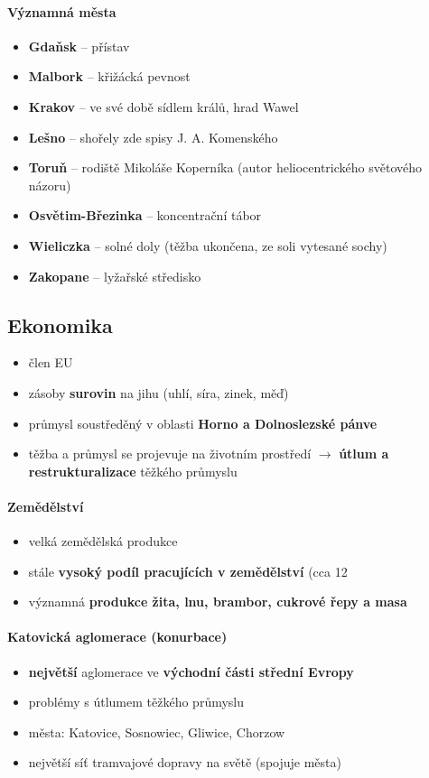 \documentclass[10pt,a4paper]{article}
\begin{document}
\paragraph{Významná města}
\begin{itemize}
\item \textbf{Gdaňsk} -- přístav
\item \textbf{Malbork} -- křižácká pevnost
\item \textbf{Krakov} -- ve své době sídlem králů, hrad Wawel
\item \textbf{Lešno} -- shořely zde spisy J. A. Komenského
\item \textbf{Toruň} -- rodiště Mikoláše Koperníka (autor heliocentrického světového názoru)
\item \textbf{Osvětim-Březinka} -- koncentrační tábor
\item \textbf{Wieliczka} -- solné doly (těžba ukončena, ze soli vytesané sochy)
\item \textbf{Zakopane} -- lyžařské středisko
\end{itemize}


\subsection{Ekonomika}
\begin{itemize}
\item člen EU
\item zásoby \textbf{surovin} na jihu (uhlí, síra, zinek, měď)
\item průmysl soustředěný v oblasti \textbf{Horno a Dolnoslezské pánve}
\item těžba a průmysl se projevuje na životním prostředí $\rightarrow$\textbf{ útlum a restrukturalizace} těžkého průmyslu
\end{itemize}

\paragraph{Zemědělství}
\begin{itemize}
\item velká zemědělská produkce
\item stále \textbf{vysoký podíl pracujících v zemědělství} (cca 12%
\item významná \textbf{produkce žita, lnu, brambor, cukrové řepy a masa}
\end{itemize}

\paragraph{Katovická aglomerace (konurbace)}
\begin{itemize}
\item \textbf{největší} aglomerace ve \textbf{východní části střední Evropy}
\item problémy s útlumem těžkého průmyslu
\item města: Katovice, Sosnowiec, Gliwice, Chorzow
\item největší síť tramvajové dopravy na světě (spojuje města)
\end{itemize}
\end{document}
